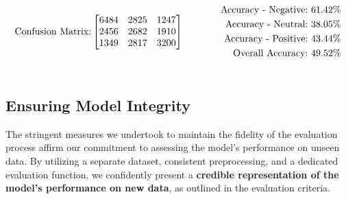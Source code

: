 \begin{align*}
    \centering
    \text{Confusion Matrix:}
    \begin{bmatrix}
        6484 & 2825 & 1247 \\
        2456 & 2682 & 1910 \\
        1349 & 2817 & 3200 \\
    \end{bmatrix}
    &\qquad\qquad
        \begin{aligned}
            \text{Accuracy - Negative:} \ 61.42\% \\
            \text{Accuracy - Neutral:} \ 38.05\% \\
            \text{Accuracy - Positive:} \ 43.44\% \\
            \text{Overall Accuracy:} \ 49.52\%
        \end{aligned}\\
        \vcenter{\hbox{\begin{minipage}{7cm}
        \end{minipage}}}
    & \notag
\end{align*}
\vspace{-2em}
\subsection{Ensuring Model Integrity}
\vspace{-1em}
The stringent measures we undertook to maintain the fidelity of the evaluation process affirm our commitment to assessing the model's performance on unseen data. By utilizing a separate dataset, consistent preprocessing, and a dedicated evaluation function, we confidently present a \textbf{credible representation of the model’s performance on new data}, as outlined in the evaluation criteria.
